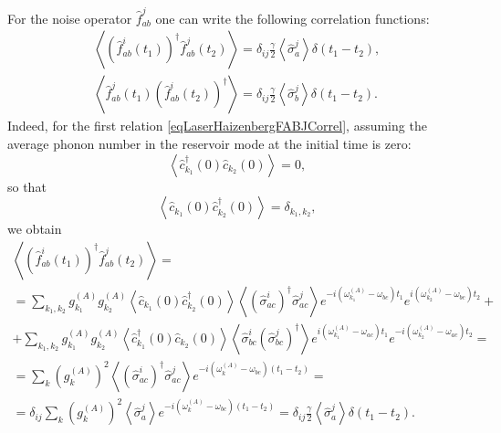 For the noise operator $\hat{f}_{ab}^{j}$ one can write the following
correlation functions:
\begin{eqnarray}
\left<\left(\hat{f}_{ab}^{i}\left(t_1\right)\right)^{\dag}\hat{f}_{ab}^{j}\left(t_2\right)\right>
= \delta_{ij}
\frac{\gamma}{2}\left<\hat{\sigma}^{j}_{a}\right>\delta\left(t_1 -
t_2\right),
\nonumber \\
\left<\hat{f}_{ab}^{j}\left(t_1\right)\left(\hat{f}_{ab}^{i}\left(t_2\right)\right)^{\dag}\right>
= \delta_{ij}
\frac{\gamma}{2}\left<\hat{\sigma}^{j}_{b}\right>\delta\left(t_1 -
t_2\right).
\label{eqLaserHaizenbergFABJCorrel}
\end{eqnarray}
Indeed, for the first relation
\eqref{eqLaserHaizenbergFABJCorrel}, assuming the average phonon number
in the reservoir mode at the initial time is zero:
\begin{equation}
\left<\hat{c}_{k_1}^{\dag}\left(0\right)\hat{c}_{k_2}\left(0\right)\right>
= 0,
\nonumber
\end{equation}
so that
\begin{equation}
\left<\hat{c}_{k_1}\left(0\right)\hat{c}_{k_2}^{\dag}\left(0\right)\right>
= \delta_{k_1,k_2},
\nonumber
\end{equation}
we obtain
\begin{eqnarray}
\left<\left(\hat{f}_{ab}^{i}\left(t_1\right)\right)^{\dag}\hat{f}_{ab}^{j}\left(t_2\right)\right>
= 
\nonumber \\
=
\sum_{k_1,k_2}
g_{k_1}^{(A)}g_{k_2}^{(A)}
\left<\hat{c}_{k_1}\left(0\right)\hat{c}_{k_2}^{\dag}\left(0\right)\right>
\left<\left(\hat{\sigma}^{i}_{ac}\right)^{\dag}\hat{\sigma}^{j}_{ac}\right>  
e^{- i\left(\omega_{k_1}^{(A)} - \omega_{bc}\right)t_1}
e^{i\left(\omega_{k_2}^{(A)} - \omega_{bc}\right)t_2} +
\nonumber \\
+
\sum_{k_1,k_2}
g_{k_1}^{(A)}g_{k_2}^{(A)}
\left<\hat{c}_{k_1}^{\dag}\left(0\right)\hat{c}_{k_2}\left(0\right)\right>
\left<\hat{\sigma}^{i}_{bc}\left(\hat{\sigma}^{j}_{bc}\right)^{\dag}\right>
e^{i\left(\omega_{k_1}^{(A)} -
  \omega_{ac}\right)t_1}e^{-i\left(\omega_{k_2}^{(A)} -
  \omega_{ac}\right)t_2} = 
\nonumber \\
= 
\sum_{k}
\left(g_{k}^{(A)}\right)^2
\left<\left(\hat{\sigma}^{i}_{ac}\right)^{\dag}\hat{\sigma}^{j}_{ac}\right>  
e^{- i\left(\omega_{k}^{(A)} - \omega_{bc}\right)\left(t_1 -
  t_2\right)} = 
\nonumber \\
=
\delta_{ij}
\sum_{k}
\left(g_{k}^{(A)}\right)^2 
\left<\hat{\sigma}^{j}_{a}\right>  
e^{- i\left(\omega_{k}^{(A)} - \omega_{bc}\right)\left(t_1 -
  t_2\right)} = 
\delta_{ij}
\frac{\gamma}{2}\left<\hat{\sigma}^{j}_{a}\right>\delta\left(t_1 - t_2\right).
\nonumber
\end{eqnarray}

